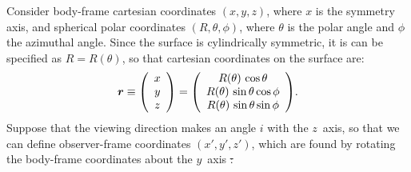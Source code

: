 \documentclass[useAMS, usenatbib, a4paper]{mnras}
\newenvironment{Vector}{\left(\begin{array}{c}}{\end{array}\right)} %
\providecommand{\DIFdeltex}[1]{{\protect\color{white!70!black} \ifmmode\scriptscriptstyle\cancel{#1}\else\tiny\sout{#1}\fi}} %
\providecommand{\DIFaddbegin}{} %
\providecommand{\DIFaddend}{} %
\providecommand{\DIFdelbegin}{} %
\providecommand{\DIFdelend}{} %
\providecommand{\DIFdel}[1]{\texorpdfstring{\DIFdeltex{#1}}{}} %
\begin{document}
Consider body-frame cartesian coordinates $(x,y,z)$, where \(x\) is
the symmetry axis, and spherical polar coordinates
\((R, \theta, \phi)\), where \(\theta\) is the polar angle and
\(\phi\) the azimuthal angle.  Since the surface is cylindrically
symmetric, it is can be specified as $R = R(\theta)$, so that
cartesian coordinates on the surface are:
\DIFdelbegin %
\DIFdelend \DIFaddbegin \begin{equation}
  \bm{r} \equiv
  \begin{Vector}
    x \\ y \\ z
  \end{Vector} 
  = 
  \begin{Vector}
    R(\theta)\, \cos\theta \\
    R(\theta)\, \sin\theta\cos\phi \\
    R(\theta)\, \sin\theta\sin\phi
  \end{Vector}.
  \label{eq:body-frame}
\end{equation} 
\DIFaddend Suppose that the viewing direction makes an angle \(i\) with the
\(z\)~axis, so that we can define observer-frame coordinates
\((x', y', z')\), which are found by rotating the body-frame
coordinates about the \(y\)~axis\DIFdelbegin \DIFdel{:
}%
\end{document}
